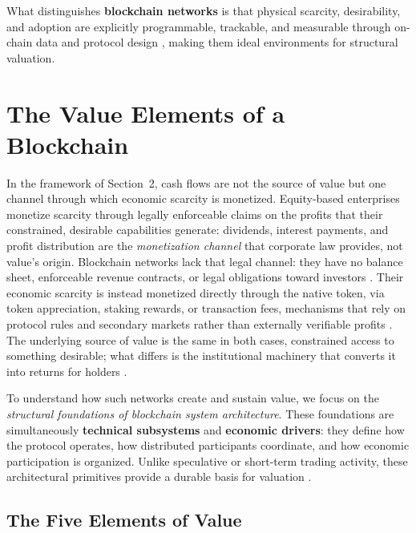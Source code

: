 \documentclass[12pt]{article}
\begin{document}
What distinguishes \textbf{blockchain networks} is that physical scarcity, desirability, and adoption are explicitly programmable, trackable, and measurable through on-chain data and protocol design \citep{cong2019blockchain, saleh2021blockchain, ramachandran2021defi}, making them ideal environments for structural valuation.



\section{The Value Elements of a Blockchain}
\label{sec:framework_elements}

In the framework of Section~2, cash flows are not the source of value but one channel through which economic scarcity is monetized. Equity-based enterprises monetize scarcity through legally enforceable claims on the profits that their constrained, desirable capabilities generate: dividends, interest payments, and profit distribution are the \emph{monetization channel} that corporate law provides, not value's origin. Blockchain networks lack that legal channel: they have no balance sheet, enforceable revenue contracts, or legal obligations toward investors \citep{gans2019economics, catalini2020some}. Their economic scarcity is instead monetized directly through the native token, via token appreciation, staking rewards, or transaction fees, mechanisms that rely on protocol rules and secondary markets rather than externally verifiable profits \citep{cong2021tokenomics, huberman2021monetizing}. The underlying source of value is the same in both cases, constrained access to something desirable; what differs is the institutional machinery that converts it into returns for holders \citep{buterin2022proof, gregory2025token}.

To understand how such networks create and sustain value, we focus on the \textit{structural foundations of blockchain system architecture}. These foundations are simultaneously \textbf{technical subsystems} and \textbf{economic drivers}: they define how the protocol operates, how distributed participants coordinate, and how economic participation is organized. Unlike speculative or short-term trading activity, these architectural primitives provide a durable basis for valuation \citep{cong2021tokenomics, canidio2021tokens}.

\subsection{The Five Elements of Value}
\end{document}
